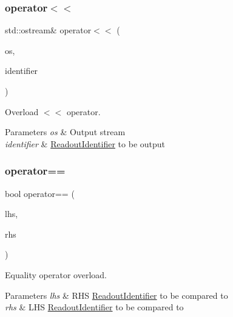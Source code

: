 \subsubsection{\texorpdfstring{operator$<$$<$}{operator<<}}
{\footnotesize\ttfamily std\+::ostream\& operator$<$$<$ (\begin{DoxyParamCaption}\item[{std\+::ostream \&}]{os,  }\item[{const \hyperlink{class_readout_identifier}{Readout\+Identifier} \&}]{identifier }\end{DoxyParamCaption})\hspace{0.3cm}{\ttfamily [friend]}}



Overload $<$$<$ operator. 


\begin{DoxyParams}{Parameters}
{\em os} & Output stream \\
\hline
{\em identifier} & \hyperlink{class_readout_identifier}{Readout\+Identifier} to be output \\
\hline
\end{DoxyParams}
\mbox{\label{class_readout_identifier_a91bb6963f51c84fd2d8bcf104fc0b226}} 
\subsubsection{\texorpdfstring{operator==}{operator==}}
{\footnotesize\ttfamily bool operator== (\begin{DoxyParamCaption}\item[{const \hyperlink{class_readout_identifier}{Readout\+Identifier} \&}]{lhs,  }\item[{const \hyperlink{class_readout_identifier}{Readout\+Identifier} \&}]{rhs }\end{DoxyParamCaption})\hspace{0.3cm}{\ttfamily [friend]}}



Equality operator overload. 


\begin{DoxyParams}{Parameters}
{\em lhs} & R\+HS \hyperlink{class_readout_identifier}{Readout\+Identifier} to be compared to \\
\hline
{\em rhs} & L\+HS \hyperlink{class_readout_identifier}{Readout\+Identifier} to be compared to \\
\hline
\end{DoxyParams}
\mbox{\label{class_readout_identifier_a8738ea1dc34492f456b68bb02aec8966}} 
